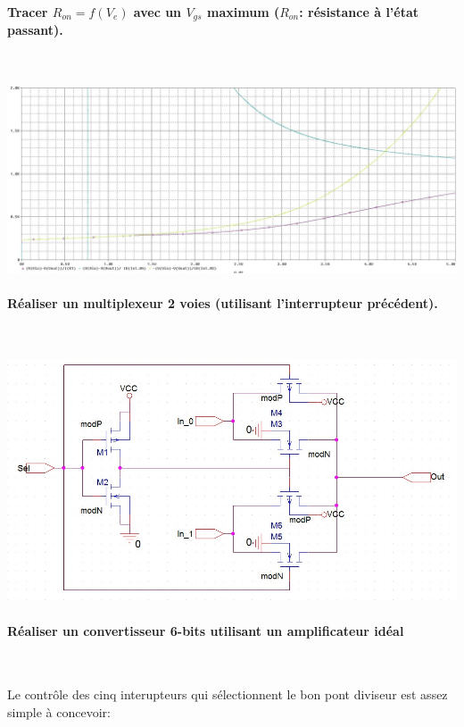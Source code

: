 \documentclass{article}
\begin{document}
\newpage

\paragraph{Tracer $R_{on} = f(V_e)$ avec un $V_{gs}$ maximum ($R_{on}$: résistance à l’état passant).}

~

\includegraphics[width=\linewidth]{becancna/Ron.jpg}

\paragraph{Réaliser un multiplexeur 2 voies (utilisant l’interrupteur précédent).}

~

\includegraphics[width=\linewidth]{becancna/MUX.jpg}

\paragraph{Réaliser un convertisseur 6-bits utilisant un amplificateur idéal}

~

Le contrôle des cinq interupteurs qui sélectionnent le bon pont diviseur est assez simple à concevoir:
\end{document}
